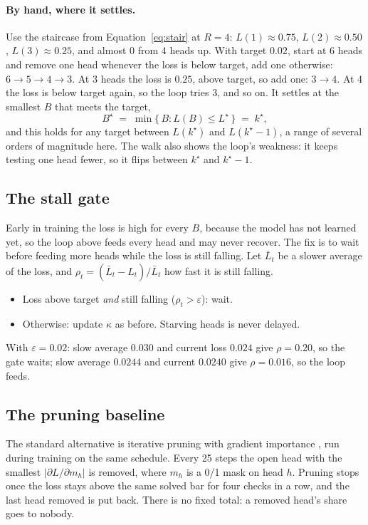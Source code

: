 \documentclass[11pt]{report}
\newcommand{\kstar}{k^\star}
\begin{document}
\paragraph{By hand, where it settles.} Use the staircase from Equation~\eqref{eq:stair} at
$R = 4$: $L(1) \approx 0.75$, $L(2) \approx 0.50$, $L(3) \approx 0.25$, and almost 0 from 4
heads up. With target $0.02$, start at 6 heads and remove one head whenever the loss is
below target, add one otherwise: $6 \to 5 \to 4 \to 3$. At 3 heads the loss is $0.25$,
above target, so add one: $3 \to 4$. At 4 the loss is below target again, so the loop
tries 3, and so on. It settles at the smallest $B$ that meets the target,
\begin{equation}
  B^\star \;=\; \min\{\, B : L(B) \le L^\star \,\} \;=\; \kstar ,
\end{equation}
and this holds for any target between $L(\kstar)$ and $L(\kstar - 1)$, a range of several
orders of magnitude here. The walk also shows the loop's weakness: it keeps testing one
head fewer, so it flips between $\kstar$ and $\kstar - 1$.

\subsection{The stall gate}

Early in training the loss is high for every $B$, because the model has not learned yet,
so the loop above feeds every head and may never recover. The fix is to wait before
feeding more heads while the loss is still falling. Let $\bar L_t$ be a slower average of
the loss, and $\rho_t = (\bar L_t - \widehat L_t)/\bar L_t$ how fast it is still falling.
\begin{itemize}
\item Loss above target \emph{and} still falling ($\rho_t > \varepsilon$): wait.
\item Otherwise: update $\kappa$ as before. Starving heads is never delayed.
\end{itemize}
With $\varepsilon = 0.02$: slow average $0.030$ and current loss $0.024$ give
$\rho = 0.20$, so the gate waits; slow average $0.0244$ and current $0.0240$ give
$\rho = 0.016$, so the loop feeds.

\subsection{The pruning baseline}

The standard alternative is iterative pruning with gradient importance \cite{michel2019},
run during training on the same schedule. Every 25 steps the open head with the smallest
$|\partial L / \partial m_h|$ is removed, where $m_h$ is a 0/1 mask on head $h$. Pruning
stops once the loss stays above the same solved bar for four checks in a row, and the
last head removed is put back. There is no fixed total: a removed head's share goes to
nobody.
\end{document}
